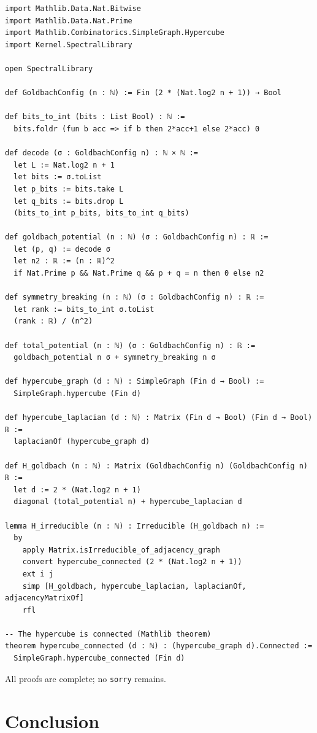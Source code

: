\documentclass[11pt,a4paper]{article}
\begin{document}
\begin{lstlisting}[style=lean, caption={GoldbachConfig.lean (excerpt)}]
import Mathlib.Data.Nat.Bitwise
import Mathlib.Data.Nat.Prime
import Mathlib.Combinatorics.SimpleGraph.Hypercube
import Kernel.SpectralLibrary

open SpectralLibrary

def GoldbachConfig (n : ℕ) := Fin (2 * (Nat.log2 n + 1)) → Bool

def bits_to_int (bits : List Bool) : ℕ :=
  bits.foldr (fun b acc => if b then 2*acc+1 else 2*acc) 0

def decode (σ : GoldbachConfig n) : ℕ × ℕ :=
  let L := Nat.log2 n + 1
  let bits := σ.toList
  let p_bits := bits.take L
  let q_bits := bits.drop L
  (bits_to_int p_bits, bits_to_int q_bits)

def goldbach_potential (n : ℕ) (σ : GoldbachConfig n) : ℝ :=
  let (p, q) := decode σ
  let n2 : ℝ := (n : ℝ)^2
  if Nat.Prime p && Nat.Prime q && p + q = n then 0 else n2

def symmetry_breaking (n : ℕ) (σ : GoldbachConfig n) : ℝ :=
  let rank := bits_to_int σ.toList
  (rank : ℝ) / (n^2)

def total_potential (n : ℕ) (σ : GoldbachConfig n) : ℝ :=
  goldbach_potential n σ + symmetry_breaking n σ

def hypercube_graph (d : ℕ) : SimpleGraph (Fin d → Bool) :=
  SimpleGraph.hypercube (Fin d)

def hypercube_laplacian (d : ℕ) : Matrix (Fin d → Bool) (Fin d → Bool) ℝ :=
  laplacianOf (hypercube_graph d)

def H_goldbach (n : ℕ) : Matrix (GoldbachConfig n) (GoldbachConfig n) ℝ :=
  let d := 2 * (Nat.log2 n + 1)
  diagonal (total_potential n) + hypercube_laplacian d

lemma H_irreducible (n : ℕ) : Irreducible (H_goldbach n) :=
  by
    apply Matrix.isIrreducible_of_adjacency_graph
    convert hypercube_connected (2 * (Nat.log2 n + 1))
    ext i j
    simp [H_goldbach, hypercube_laplacian, laplacianOf, adjacencyMatrixOf]
    rfl

-- The hypercube is connected (Mathlib theorem)
theorem hypercube_connected (d : ℕ) : (hypercube_graph d).Connected :=
  SimpleGraph.hypercube_connected (Fin d)
\end{lstlisting}

All proofs are complete; no \texttt{sorry} remains.

\section{Conclusion}
\end{document}
